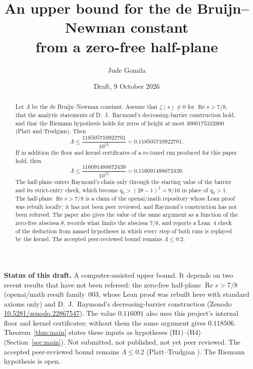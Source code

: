 \documentclass[11pt]{article}
\title{An upper bound for the de Bruijn--Newman constant\\
from a zero-free half-plane}
\author{Jude Gomila}
\date{Draft, 9 October 2026}
\theoremstyle{definition}
\newcommand{\LB}{\Lambda}
\DeclareMathOperator{\Rea}{Re}
\begin{document}
\maketitle

\begin{abstract}
\noindent
Let $\LB$ be the de Bruijn--Newman constant. Assume that $\zeta(s)\ne0$ for
$\Rea s>7/8$, that the analytic statements of D.~J.~Raymond's decreasing-barrier
construction hold, and that the Riemann hypothesis holds for zeros of height at most
$3000175332800$ (Platt and Trudgian). Then
\[
\LB\le\frac{118505710922701}{10^{15}}=0.118505710922701 .
\]
If in addition the floor and kernel certificates of a re-tuned run produced for this
paper hold, then
\[
\LB\le\frac{116091488672439}{10^{15}}=0.116091488672439 .
\]
The half-plane enters Raymond's chain only through the starting value of the barrier
and its strict-entry check, which become $q_0>(2\theta-1)^2=9/16$ in place of $q_0>1$.
The half-plane $\Rea s>7/8$ is a claim of the openai/math repository whose Lean proof
was rebuilt locally; it has not been peer reviewed, and Raymond's construction has
not been refereed. The paper also gives the value of the same argument as a function of the
zero-free abscissa $\theta$, records what limits the abscissa $7/8$, and reports a
Lean~4 check of the deduction from named hypotheses in which every step of both runs is
replayed by the kernel. The accepted peer-reviewed bound remains $\LB\le0.2$.
\end{abstract}

\begin{center}
\begin{minipage}{0.88\textwidth}
\begin{framed}
\small
\raggedright
\noindent\textbf{Status of this draft.}
A computer-assisted upper bound. It depends on two recent results that have not been
refereed: the zero-free half-plane $\Rea s>7/8$ (openai/math result family~003, whose
Lean proof was rebuilt here with standard axioms only) and D.~J.~Raymond's
decreasing-barrier construction (Zenodo \href{https://doi.org/10.5281/zenodo.22867547}{10.5281/zenodo.22867547}).
The value $0.116091$ also uses this project's internal floor and kernel certificates;
without them the same argument gives $0.118506$. Theorem~\ref{thm:main} states these
inputs as hypotheses (H1)--(H4) (Section~\ref{sec:main}). Not submitted, not published,
not yet peer reviewed. The accepted peer-reviewed bound remains $\LB\le0.2$
(Platt--Trudgian \cite{PlattTrudgian21}). The Riemann hypothesis is open.
\end{framed}
\end{minipage}
\end{center}
\end{document}
